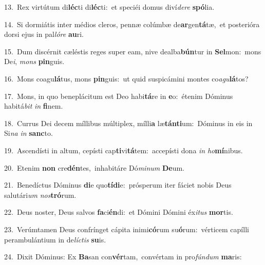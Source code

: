 {\numbfont\textcolor{\numbcolor}{13.}}~Rex virtútum di\-\textbf{léc}\-ti di\-\textbf{léc}\-ti:~\star et speciéi domus diví\-\textit{de}\-\textit{re} \textbf{spó}\-lia.\par
{\numbfont\textcolor{\numbcolor}{14.}}~Si dormiátis inter médios cleros, pennæ colúmbæ de\-\textbf{ar}\-gen\-\textbf{tá}\-tæ,~\star et posterióra dorsi ejus in pal\-\textit{ló}\-\textit{re} \textbf{au}\-ri.\par
{\numbfont\textcolor{\numbcolor}{15.}}~Dum discérnit cæléstis reges super eam, nive dealba\-\textbf{bún}\-tur in \textbf{Sel}\-mon:~\star mons De\-\textit{i}\-, \textit{mons} \textbf{pin}\-guis.\par
{\numbfont\textcolor{\numbcolor}{16.}}~Mons coagu\-\textbf{lá}\-tus, mons \textbf{pin}\-guis:~\star ut quid suspicámini montes co\-\textit{a}\-\textit{gu}\textbf{lá}tos?\par
{\numbfont\textcolor{\numbcolor}{17.}}~Mons, in quo beneplácitum est Deo habi\-\textbf{tá}\-re in \textbf{e}\-o:~\star étenim Dóminus habitá\textit{bit} \textit{in} \textbf{fi}\-nem.\par
{\numbfont\textcolor{\numbcolor}{18.}}~Currus Dei decem míllibus múltiplex, mílli\textbf{a} læ\-\textbf{tán}\-\textbf{ti}um:~\star Dóminus in eis in Si\textit{na} \textit{in} \textbf{sanc}\-to.\par
{\numbfont\textcolor{\numbcolor}{19.}}~Ascendísti in altum, cepísti cap\-\textbf{ti}\-vi\-\textbf{tá}\-tem:~\star accepísti dona \textit{in} \textit{ho}\-\textbf{mí}nibus.\par
{\numbfont\textcolor{\numbcolor}{20.}}~Etenim \textbf{non} cre\-\textbf{dén}\-tes,~\star inhabitáre Dó\-\textit{mi}\-\textit{num} \textbf{De}\-um.\par
{\numbfont\textcolor{\numbcolor}{21.}}~Benedíctus Dóminus \textbf{di}\-e quo\-\textbf{tí}\-\textbf{di}e:~\star prósperum iter fáciet nobis Deus salutári\textit{um} \textit{nos}\-\textbf{tró}rum.\par
{\numbfont\textcolor{\numbcolor}{22.}}~Deus noster, Deus salvos \textbf{fa}\-ci\-\textbf{én}\-di:~\star et Dómini Dómini éx\-\textit{i}\-\textit{tus} \textbf{mor}\-tis.\par
{\numbfont\textcolor{\numbcolor}{23.}}~Verúmtamen Deus confrínget cápita inimi\-\textbf{có}\-rum su\-\textbf{ó}\-rum:~\star vérticem capílli perambulántium in de\-\textit{líc}\-\textit{tis} \textbf{su}\-is.\par
{\numbfont\textcolor{\numbcolor}{24.}}~Dixit Dóminus: Ex \textbf{Ba}\-san con\-\textbf{vér}\-tam,~\star convértam in pro\-\textit{fún}\-\textit{dum} \textbf{ma}\-ris:\par
